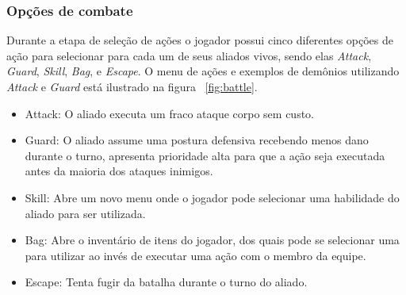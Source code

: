 \documentclass[
	12pt,				%
	openright,			%
	twoside,			%
	a4paper,			%
	english,			%
	french,				%
	spanish,			%
	brazil				%
	]{abntex2}
\begin{document}
\subsubsection{Opções de combate}\label{chap:BattleOptions}

Durante a etapa de seleção de ações o jogador possui cinco diferentes opções de ação para selecionar para cada um de seus aliados vivos, sendo elas \emph{Attack}, \emph{Guard}, \emph{Skill}, \emph{Bag}, e \emph{Escape}. O menu de ações e exemplos de demônios utilizando \emph{Attack} e \emph{Guard} está ilustrado na figura ~\ref{fig:battle}.

\begin{itemize}

\item Attack: O aliado executa um fraco ataque corpo sem custo.
\item Guard: O aliado assume uma postura defensiva recebendo menos dano durante o turno, apresenta prioridade alta para que a ação seja executada antes da maioria dos ataques inimigos.
\item Skill: Abre um novo menu onde o jogador pode selecionar uma habilidade do aliado para ser utilizada.
\item Bag: Abre o inventário de itens do jogador, dos quais pode se selecionar uma para utilizar ao invés de executar uma ação com o membro da equipe.
\item Escape: Tenta fugir da batalha durante o turno do aliado.

\end{itemize}
\end{document}
